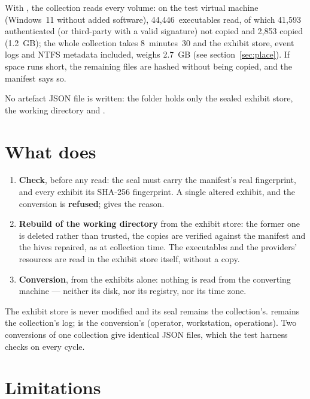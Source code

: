 \documentclass[11pt,a4paper,oneside]{report}
\begin{document}
\begin{attention}
With , the collection reads every volume: on the test virtual
machine (Windows~11 without added software), 44,446~executables read, of which
41,593 authenticated (or third-party with a valid signature) not copied and
2,853 copied (1.2~GB); the whole collection takes 8~minutes~30 and the
exhibit store, event logs and NTFS metadata included, weighs 2.7~GB (see
section~\ref{sec:place}). If space runs short, the remaining files are hashed without being
copied, and the manifest says so.
\end{attention}

No artefact JSON file is written: the folder holds only the sealed exhibit
store, the working directory and .

\section{What  does}

\begin{enumerate}
  \item \textbf{Check}, before any read: the seal must carry the manifest's
        real fingerprint, and every exhibit its SHA-256 fingerprint. A single
        altered exhibit, and the conversion is \textbf{refused};
         gives the reason.
  \item \textbf{Rebuild of the working directory} from the exhibit store: the
        former one is deleted rather than trusted, the copies are verified
        against the manifest and the hives repaired, as at collection time. The
        executables and the providers' resources are read in the exhibit store
        itself, without a copy.
  \item \textbf{Conversion}, from the exhibits alone: nothing is read from the
        converting machine — neither its disk, nor its registry, nor its time
        zone.
\end{enumerate}

The exhibit store is never modified and its seal remains the collection's.
 remains the collection's log;
 is the conversion's (operator, workstation,
operations). Two conversions of one collection give identical JSON files,
which the test harness checks on every cycle.

\section{Limitations}
\end{document}
